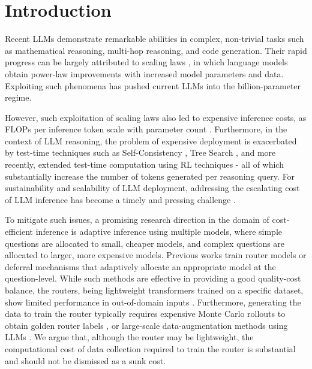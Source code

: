 \documentclass[letterpaper]{article} %
\begin{document}

\section{Introduction}
Recent LLMs demonstrate remarkable abilities in complex, non-trivial tasks such as mathematical reasoning, multi-hop reasoning, and code generation. Their rapid progress can be largely attributed to scaling laws \citep{kaplan2020scaling,DBLP:conf/icml/SardanaPDF24}, in which language models obtain power-law improvements with increased model parameters and data. Exploiting such phenomena has pushed current LLMs into the billion-parameter regime.

 However, such exploitation of scaling laws also led to expensive inference costs, as FLOPs per inference token scale with parameter count \cite{kaplan2020scaling,DBLP:conf/icml/SardanaPDF24}. Furthermore, in the context of LLM reasoning, the problem of expensive deployment is exacerbated by test-time techniques such as Self-Consistency \citep{wangself}, Tree Search \citep{yao2023tree}, and more recently, extended test-time computation using RL techniques \citep{guo2025deepseek} - all of which substantially increase the number of tokens generated per reasoning query. For sustainability and scalability of LLM deployment, addressing the escalating cost of LLM inference has become a timely and pressing challenge \citep{faiz2024llmcarbon,poddar-etal-2025-towards}.

To mitigate such issues, a promising research direction in the domain of cost-efficient inference is adaptive inference using multiple models, where simple questions are allocated to small, cheaper models, and complex questions are allocated to larger, more expensive models. Previous works \citep{chenfrugalgpt,gupta2024language,ong2024routellm,ding2024hybrid,damani2024learninghardthinkinputadaptive} train router models or deferral mechanisms that adaptively allocate an appropriate model at the question-level. While such methods are effective in providing a good quality-cost balance, the routers, being lightweight transformers trained on a specific dataset, show limited performance in out-of-domain inputs \citep{ong2024routellm,ding2024hybrid}. Furthermore, generating the data to train the router typically requires expensive Monte Carlo rollouts to obtain golden router labels  \citep{damani2024learninghardthinkinputadaptive,ding2024hybrid}, or large-scale data-augmentation methods using LLMs \citep{ong2024routellm}. We argue that, although the router may be lightweight, the computational cost of data collection required to train the router is substantial and should not be dismissed as a sunk cost.
\end{document}

